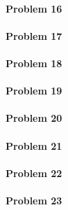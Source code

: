 \paragraph{Problem 16}
\paragraph{Problem 17}
\paragraph{Problem 18}
\paragraph{Problem 19}
\paragraph{Problem 20}
\paragraph{Problem 21}
\paragraph{Problem 22}
\paragraph{Problem 23}
